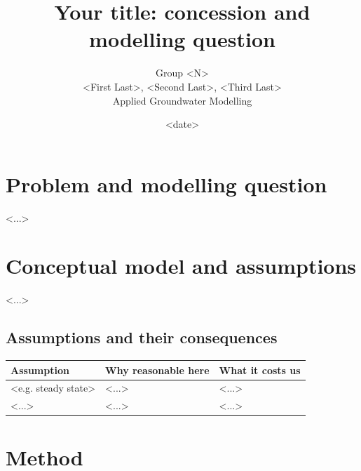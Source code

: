 \documentclass[11pt,a4paper]{article}
\title{Your title: concession and modelling question}
\author{Group <N> \\
        <First Last>, <Second Last>, <Third Last> \\
        Applied Groundwater Modelling}
\date{<date>}
\begin{document}
\maketitle

\section{Problem and modelling question}

<...>

\section{Conceptual model and assumptions}
%

<...>

\subsection{Assumptions and their consequences}

\begin{tabularx}{\textwidth}{@{}YYY@{}}
\toprule
Assumption & Why reasonable here & What it costs us \\
\midrule
<e.g. steady state> & <...> & <...> \\
<...>               & <...> & <...> \\
\bottomrule
\end{tabularx}
\par\medskip

\section{Method}
\end{document}

